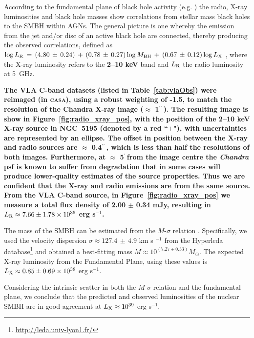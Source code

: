 \documentclass[fleqn,usenatbib]{mnras}
\def\fig{Figure}
\def\tab{Table}
\def\arcm{$^{\prime}\,$}
\def\arcs{$^{\prime\prime}\,$}
\begin{document}
According to the fundamental plane of black hole activity (e.g. \citealt{Merloni+2003,Falcke+2004,Kordingetal2006b}) the radio, X-ray luminosities and black hole masses show correlations 
from stellar mass black holes to the SMBH within AGNs. The general picture is one whereby the emission from the jet and/or disc of an active black hole are connected, thereby producing the 
observed correlations, defined as $\log L_{\rm R}\,=\,(4.80\,\pm\,0.24)\,+\,(0.78\,\pm\,0.27)\log M_{\rm BH}\,+\,(0.67\,\pm\,0.12)\log L_{\rm X}$ \citep{Gultekinetal2009}, where the 
X-ray luminosity refers to the \textbf{2--10 keV} band and $L_{\rm R}$ the radio luminosity at 5~GHz.

\textbf{The VLA C-band datasets (listed in \tab~\ref{tab:vlaObs}) were reimaged (in \textsc{casa}), using a robust weighting of -1.5, to match the resolution of the \textbf{Chandra} X-ray 
image ($\approx$ 1\arcs). The resulting image is show in \fig~\ref{fig:radio_xray_pos}, with the position of the 2--10 keV X-ray source in NGC~5195 (denoted by a red ``$+$"), with 
uncertainties are represented by an ellipse. The offset in position between the X-ray and radio sources are $\approx$ 0.4\arcs, which is less than half the resolutions of both images. Furthermore, at $\approx$ 5\arcm from the image centre the \textit{Chandra} psf is known to suffer from degradation \citep{Broosetal2010} that in some cases will produce lower-quality estimates of the source properties.
Thus we are confident that the X-ray and radio emissions are from the same source. From the VLA C-band source, in \fig~\ref{fig:radio_xray_pos} we measure a total flux density of 2.00 $\pm$ 0.34 mJy, resulting in $L_{\rm R} \approx 7.66 \pm 1.78 \times 10^{35}$ erg s$^{-1}$. }

The mass of the SMBH can be estimated from the $M$-$\sigma$ relation \citep{vandenBosch2016}. Specifically, we used the velocity dispersion $\sigma \approx 127.4\,\pm\,4.9$ km s
$^{-1}$ from the Hyperleda database\footnote{\url{http://leda.univ-lyon1.fr/}} and obtained a best-fitting mass $M \approx 10^{(7.27\pm 0.33)} M_{\odot}$. The expected X-ray luminosity 
from the Fundamental Plane, using these values is $L_{\rm X} \approx 0.85 \pm 0.69 \times 10^{38}$ erg s$^{-1}$. 

Considering the intrinsic scatter in both the $M$-$\sigma$ relation and the fundamental plane, we conclude that the 
predicted and observed luminosities of the nuclear SMBH are in good agreement at $L_{\rm X} \approx  10^{39}$ erg s$^{-1}$. 
\end{document}
